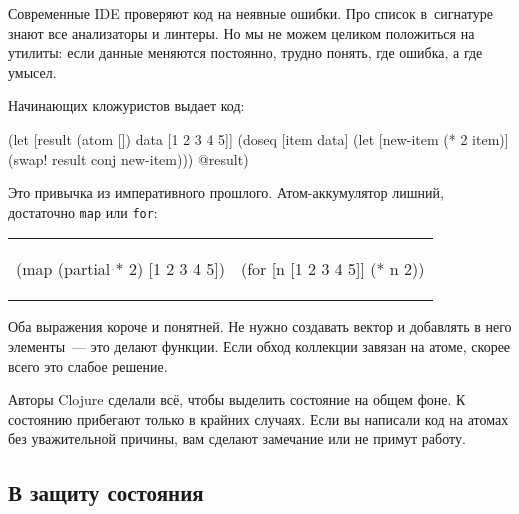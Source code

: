 Современные IDE проверяют код на неявные ошибки. Про список в~сигнатуре знают
все анализаторы и линтеры. Но мы не можем целиком положиться на утилиты: если
данные меняются постоянно, трудно понять, где ошибка, а где умысел.

Начинающих кложуристов выдает код:

\begin{english}
  \begin{clojure}
(let [result (atom [])
      data [1 2 3 4 5]]
  (doseq [item data]
    (let [new-item (* 2 item)]
      (swap! result conj new-item)))
  @result)
  \end{clojure}
\end{english}


\noindent
Это привычка из императивного прошлого. Атом-аккумулятор лишний, достаточно
\verb|map| или \verb|for|:


\noindent
\begin{tabular}{ @{}p{5cm} @{}p{5cm} }

\begin{english}
  \begin{clojure}
(map (partial * 2)
     [1 2 3 4 5])
  \end{clojure}
\end{english}

&

\begin{english}
  \begin{clojure}
(for [n [1 2 3 4 5]]
  (* n 2))
  \end{clojure}
\end{english}

\end{tabular}

Оба выражения короче и понятней. Не нужно создавать вектор и добавлять в него
элементы~--- это делают функции. Если обход коллекции завязан на
атоме, скорее всего это слабое решение.

Авторы Clojure сделали всё, чтобы выделить состояние на общем фоне. К
состоянию прибегают только в крайних случаях. Если вы написали код на атомах без
уважительной причины, вам сделают замечание или не примут работу.


\subsection{В защиту состояния}

